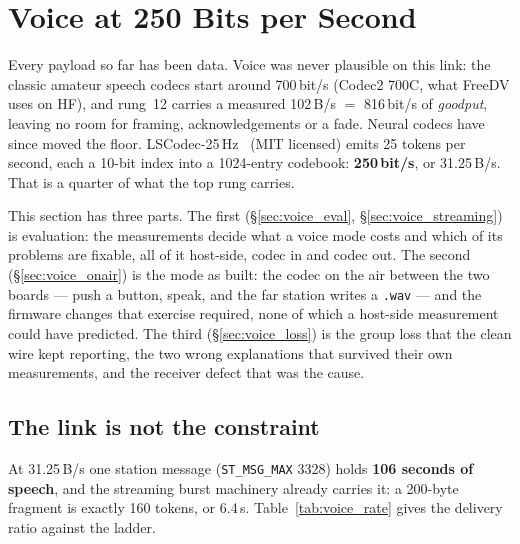\section{Voice at 250 Bits per Second}
\label{sec:cport_voice}

Every payload so far has been data.  Voice was never plausible on this
link: the classic amateur speech codecs start around 700\,bit/s
(Codec2 700C, what FreeDV uses on HF), and rung~12 carries a measured
102\,B/s $=$ 816\,bit/s of \emph{goodput}, leaving no room for framing,
acknowledgements or a fade.  Neural codecs have since moved the floor.
LSCodec-25\,Hz~\cite{guo2025lscodec} (MIT licensed)
emits 25 tokens per second, each a 10-bit index into a 1024-entry
codebook: \textbf{250\,bit/s}, or 31.25\,B/s.  That is a quarter of
what the top rung carries.

This section has three parts.  The first (\S\ref{sec:voice_eval},
\S\ref{sec:voice_streaming}) is evaluation: the measurements decide
what a voice mode costs and which of its problems are fixable, all of
it host-side, codec in and codec out.  The second
(\S\ref{sec:voice_onair}) is the mode as built: the codec on the air
between the two boards --- push a button, speak, and the far station
writes a \texttt{.wav} --- and the firmware changes that exercise
required, none of which a host-side measurement could have predicted.
The third (\S\ref{sec:voice_loss}) is the group loss that the clean
wire kept reporting, the two wrong explanations that survived their own
measurements, and the receiver defect that was the cause.

\subsection{The link is not the constraint}

At 31.25\,B/s one station message (\texttt{ST\_MSG\_MAX} 3328) holds
\textbf{106 seconds of speech}, and the streaming burst machinery
already carries it: a 200-byte fragment is exactly 160 tokens, or
6.4\,s.  Table~\ref{tab:voice_rate} gives the delivery ratio against
the ladder.

